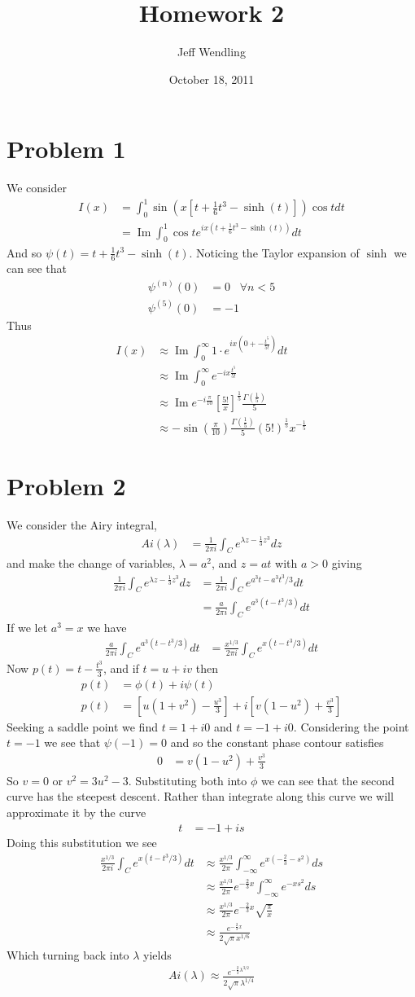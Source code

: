 \documentclass[12pt]{article}
\title{Homework 2}
\author{Jeff Wendling}
\date{October 18, 2011}
\newcommand{\eq}[1]{\begin{align*}#1\end{align*}}
\newcommand{\on}[1]{\operatorname{#1}}
\begin{document}
\maketitle
\section*{Problem 1}
We consider
\eq{
	I(x) &= \int_0^1 \sin(x[t + \frac{1}{6}t^3 - \sinh(t)])\cos t dt\\
	&= \on{Im}\int_0^1 \cos t e^{ix(t + \frac{1}{6}t^3 - \sinh(t))} dt
}
And so $\psi(t) = t + \frac{1}{6}t^3 - \sinh(t)$. Noticing the Taylor expansion of $\sinh$ we can see that
\eq{
	\psi^{(n)}(0) &= 0 \;\;\;\forall n < 5\\
	\psi^{(5)}(0) &= -1
}
Thus
\eq{
	I(x) &\approx \on{Im}\int_0^\infty 1\cdot e^{ix(0 + -\frac{t^5}{5!})} dt\\
	&\approx \on{Im}\int_0^\infty e^{-ix\frac{t^5}{5!}}\\
	&\approx \on{Im} e^{-i\frac{\pi}{10}} \left[\frac{5!}{x}\right]^{\frac{1}{5}} \frac{\Gamma(\frac{1}{5})}{5}\\
	&\approx -\sin(\frac{\pi}{10})\frac{\Gamma(\frac{1}{5})}{5}(5!)^\frac{1}{5}x^{-\frac{1}{5}}
}
\section*{Problem 2}
We consider the Airy integral,
\eq{
	Ai(\lambda) &= \frac{1}{2\pi i}\int_C e^{\lambda z - \frac{1}{3}z^3}dz
}
and make the change of variables, $\lambda = a^2$, and $z = at$ with $a > 0$ giving
\eq{
	\frac{1}{2\pi i}\int_C e^{\lambda z - \frac{1}{3}z^3}dz &= \frac{1}{2\pi i}\int_C e^{a^3t - a^3t^3/3}dt\\
	&= \frac{a}{2\pi i}\int_C e^{a^3(t - t^3/3)}dt
}
If we let $a^3 = x$ we have
\eq{
	\frac{a}{2\pi i}\int_C e^{a^3(t - t^3/3)}dt &= \frac{x^{1/3}}{2\pi i}\int_C e^{x(t - t^3/3)} dt
}
Now $p(t) = t - \frac{t^3}{3}$, and if $t = u + iv$ then
\eq{
	p(t) &= \phi(t) + i\psi(t)\\
	p(t) &= [u(1+v^2) - \frac{u^3}{3}] + i[v(1-u^2) + \frac{v^3}{3}]
}
Seeking a saddle point we find $t = 1 + i0$ and $t = -1 + i0$.
Considering the point $t = -1$ we see that $\psi(-1) = 0$ and so the constant phase contour satisfies
\eq{
	0 &= v(1-u^2) + \frac{v^3}{3}
}
So $v = 0$ or $v^2 = 3u^2 - 3$. Substituting both into $\phi$ we can see that the second curve has the steepest descent.
Rather than integrate along this curve we will approximate it by the curve
\eq{
	t &= -1 + is
}
Doing this substitution we see
\eq{
	\frac{x^{1/3}}{2\pi i}\int_C e^{x(t - t^3/3)} dt &\approx \frac{x^{1/3}}{2\pi} \int_{-\infty}^\infty e^{x(-\frac{2}{3} - s^2)} ds\\
	&\approx \frac{x^{1/3}}{2\pi}e^{-\frac{2}{3}x}\int_{-\infty}^\infty e^{-xs^2}ds\\
	&\approx \frac{x^{1/3}}{2\pi}e^{-\frac{2}{3}x}\sqrt{\frac{\pi}{x}}\\
	&\approx \frac{e^{-\frac{2}{3}x}}{2\sqrt{\pi}x^{1/6}}
}
Which turning back into $\lambda$ yields
\eq{
	Ai(\lambda) \approx \frac{e^{-\frac{2}{3}\lambda^{3/2}}}{2\sqrt{\pi}\lambda^{1/4}}
}
\end{document}
